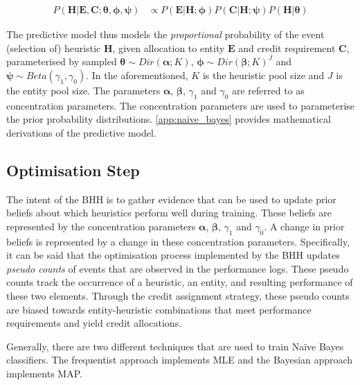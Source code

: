 \documentclass[preprint,review,12pt]{elsarticle}
\begin{document}
\begin{equation}
	\label{eq:bhh:selection_mechanism:predictive_model_prop_to}
	\begin{split}
		P(\boldsymbol{H} \vert \boldsymbol{E}, \boldsymbol{C}; \boldsymbol{\theta}, \boldsymbol{\phi}, \boldsymbol{\psi}) &\propto P(\boldsymbol{E} \vert \boldsymbol{H}; \boldsymbol{\phi}) P(\boldsymbol{C} \vert \boldsymbol{H}; \boldsymbol{\psi}) P(\boldsymbol{H} \vert \boldsymbol{\theta})
	\end{split}
\end{equation}

The predictive model thus models the \textit{proportional} probability of the event (selection of) heuristic $\boldsymbol{H}$, given allocation to entity $\boldsymbol{E}$ and credit requirement $\boldsymbol{C}$, parameterised by sampled $\boldsymbol{\theta} \sim Dir(\boldsymbol{\alpha}; K)$, $\boldsymbol{\phi} \sim Dir(\boldsymbol{\beta}; K)^{J}$ and $\boldsymbol{\psi} \sim Beta(\gamma_{1}, \gamma_{0})$. In the aforementioned, $K$ is the heuristic pool size and $J$ is the entity pool size. The parameters $\boldsymbol{\alpha}$, $\boldsymbol{\beta}$, $\gamma_{1}$ and $\gamma_{0}$ are referred to as concentration parameters. The concentration parameters are used to parameterise the prior probability distributions. \ref{app:naive_bayes} provides mathematical derivations of the predictive model.

\subsection{Optimisation Step}\label{sec:bhh:optimisation_step}

The intent of the \acs{BHH} is to gather evidence that can be used to update prior beliefs about which heuristics perform well during training. These beliefs are represented by the concentration parameters $\boldsymbol{\alpha}$, $\boldsymbol{\beta}$, $\gamma_{1}$ and $\gamma_{0}$. A change in prior beliefs is represented by a change in these concentration parameters. Specifically, it can be said that the optimisation process implemented by the \acs{BHH} updates \textit{pseudo counts} of events that are observed in the performance logs. These pseudo counts track the occurrence of a heuristic, an entity, and resulting performance of these two elements. Through the credit assignment strategy, these pseudo counts are biased towards entity-heuristic combinations that meet performance requirements and yield credit allocations.

Generally, there are two different techniques that are used to train Naïve Bayes classifiers. The frequentist approach implements \acf{MLE} and the Bayesian approach implements \acf{MAP}.
\end{document}
